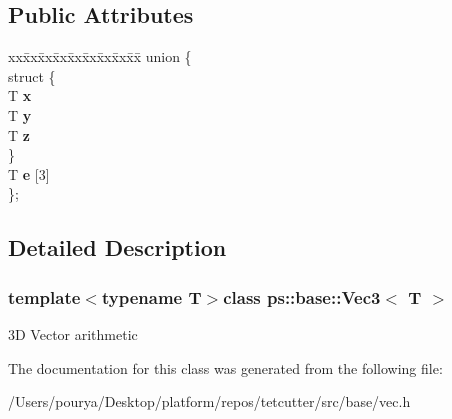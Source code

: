 \subsection*{Public Attributes}
\begin{DoxyCompactItemize}
\item 
\hypertarget{classps_1_1base_1_1Vec3_aa321188a4848a7eb1e34e27a3328afe4}{}\begin{tabbing}
xx\=xx\=xx\=xx\=xx\=xx\=xx\=xx\=xx\=\kill
union \{\\
\hypertarget{unionps_1_1base_1_1Vec3_1_1_0D9_ae896eee4a10b38c6bf5ababdc7a3fcfc}{}\>struct \{\\
\>\>T {\bfseries x}\\
\>\>T {\bfseries y}\\
\>\>T {\bfseries z}\\
\>\} \label{unionps_1_1base_1_1Vec3_1_1_0D9_ae896eee4a10b38c6bf5ababdc7a3fcfc}
\\
\>T {\bfseries e} \mbox{[}3\mbox{]}\\
\}; \label{classps_1_1base_1_1Vec3_aa321188a4848a7eb1e34e27a3328afe4}
\\

\end{tabbing}\end{DoxyCompactItemize}


\subsection{Detailed Description}
\subsubsection*{template$<$typename T$>$class ps\+::base\+::\+Vec3$<$ T $>$}

3\+D Vector arithmetic 

The documentation for this class was generated from the following file\+:\begin{DoxyCompactItemize}
\item 
/\+Users/pourya/\+Desktop/platform/repos/tetcutter/src/base/vec.\+h\end{DoxyCompactItemize}
